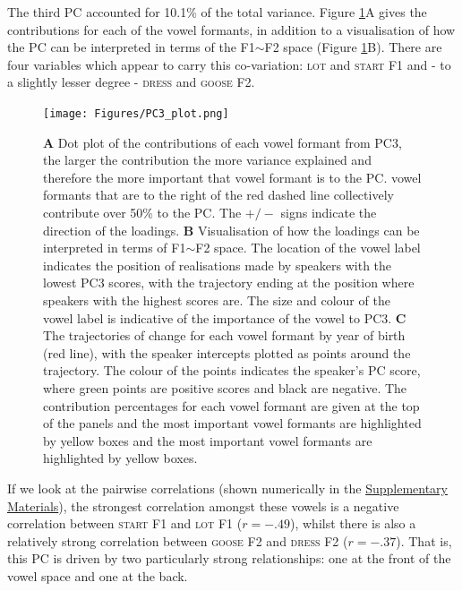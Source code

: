 \documentclass[review]{elsarticle} %
\begin{document}

The third PC accounted for 10.1\% of the total variance. Figure \ref{fig:PC3_variable_loadings}A gives the contributions for each of the vowel formants, in addition to a visualisation of how the PC can be interpreted in terms of the F1$\sim$F2 space (Figure \ref{fig:PC3_variable_loadings}B). There are four variables which appear to carry this co-variation: \textsc{lot} and \textsc{start} F1 and - to a slightly lesser degree - \textsc{dress} and \textsc{goose} F2.


\begin{figure}[!p]
\texttt{[image: Figures/PC3\_plot.png]}
\caption{\textbf{A} Dot plot of the contributions of each vowel formant from PC3, the larger the contribution the more variance explained and therefore the more important that vowel formant is to the PC. vowel formants that are to the right of the red dashed line collectively contribute over 50\% to the PC. The $+/-$ signs indicate the direction of the loadings. \textbf{B} Visualisation of how the loadings can be interpreted in terms of F1$\sim$F2 space. The location of the vowel label indicates the position of realisations made by speakers with the lowest PC3 scores, with the trajectory ending at the position where speakers with the highest scores are. The size and colour of the vowel label is indicative of the importance of the vowel to PC3. \textbf{C} The trajectories of change for each vowel formant by year of birth (red line), with the speaker intercepts plotted as points around the trajectory. The colour of the points indicates the speaker's PC score, where green points are positive scores and black are negative. The contribution percentages for each vowel formant are given at the top of the panels and the most important vowel formants are highlighted by yellow boxes and the most important vowel formants are highlighted by yellow boxes.}
\label{fig:PC3_variable_loadings}
\end{figure}

If we look at the pairwise correlations (shown numerically in the \hyperref[sec:supplementarymaterials]{Supplementary Materials}), the strongest correlation amongst these vowels is a negative correlation between \textsc{start} F1 and \textsc{lot} F1 ($r = -.49$), whilst there is also a relatively strong correlation between \textsc{goose} F2 and \textsc{dress} F2 ($r = -.37$).  That is, this PC is driven by two particularly strong relationships: one at the front of the vowel space and one at the back.
\end{document}
